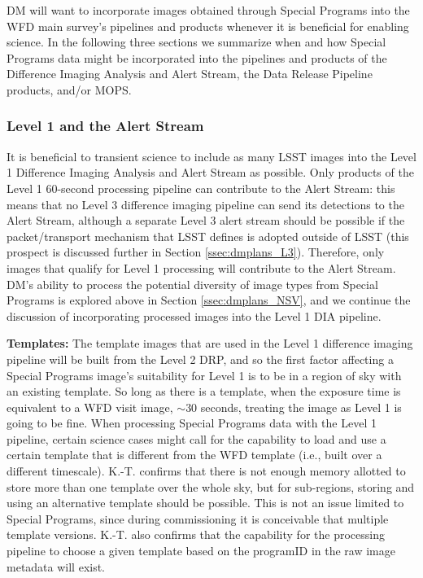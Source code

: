 \documentclass[DM,lsstdraft,toc]{lsstdoc}
\begin{document}
DM will want to incorporate images obtained through Special Programs into the WFD main survey's pipelines and products whenever it is beneficial for enabling science. In the following three sections we summarize when and how Special Programs data might be incorporated into the pipelines and products of the Difference Imaging Analysis and Alert Stream, the Data Release Pipeline products, and/or MOPS.

\subsubsection{Level 1 and the Alert Stream}\label{ssec:dmplans_WFD_L1}

It is beneficial to transient science to include as many LSST images into the Level 1 Difference Imaging Analysis and Alert Stream as possible. Only products of the Level 1 $60$-second processing pipeline can contribute to the Alert Stream: this means that no Level 3 difference imaging pipeline can send its detections to the Alert Stream, although a separate Level 3 alert stream should be possible if the packet/transport mechanism that LSST defines is adopted outside of LSST (this prospect is discussed further in Section \ref{ssec:dmplans_L3}). Therefore, only images that qualify for Level 1 processing will contribute to the Alert Stream. DM's ability to process the potential diversity of image types from Special Programs is explored above in Section \ref{ssec:dmplans_NSV}, and we continue the discussion of incorporating processed images into the Level 1 DIA pipeline.

{\bf Templates:} The template images that are used in the Level 1 difference imaging pipeline will be built from the Level 2 DRP, and so the first factor affecting a Special Programs image's suitability for Level 1 is to be in a region of sky with an existing template. So long as there is a template, when the exposure time is equivalent to a WFD visit image, $\sim 30$ seconds, treating the image as Level 1 is going to be fine. When processing Special Programs data with the Level 1 pipeline, certain science cases might call for the capability to load and use a certain template that is different from the WFD template (i.e., built over a different timescale). K.-T. confirms that there is not enough memory allotted to store more than one template over the whole sky, but for sub-regions, storing and using an alternative template should be possible. This is not an issue limited to Special Programs, since during commissioning it is conceivable that multiple template versions. K.-T. also confirms that the capability for the processing pipeline to choose a given template based on the programID in the raw image metadata will exist.
\end{document}
